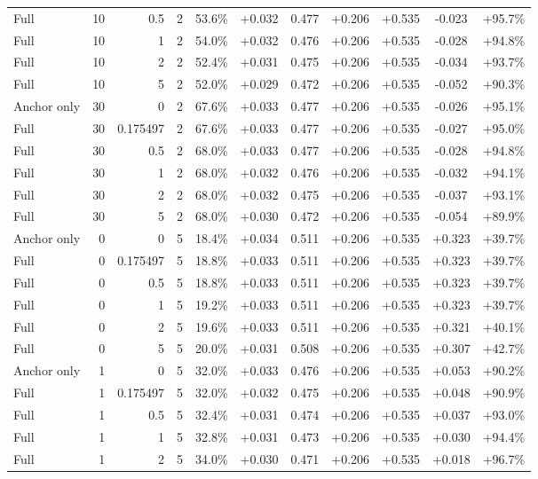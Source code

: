 \begin{table}[htbp]
\begin{tabular}{lrrrccccccc}
Full & 10 & 0.5 & 2 & 53.6\% & +0.032 & 0.477 & +0.206 & +0.535 & -0.023 & +95.7\% \\
Full & 10 & 1 & 2 & 54.0\% & +0.032 & 0.476 & +0.206 & +0.535 & -0.028 & +94.8\% \\
Full & 10 & 2 & 2 & 52.4\% & +0.031 & 0.475 & +0.206 & +0.535 & -0.034 & +93.7\% \\
Full & 10 & 5 & 2 & 52.0\% & +0.029 & 0.472 & +0.206 & +0.535 & -0.052 & +90.3\% \\
Anchor only & 30 & 0 & 2 & 67.6\% & +0.033 & 0.477 & +0.206 & +0.535 & -0.026 & +95.1\% \\
Full & 30 & 0.175497 & 2 & 67.6\% & +0.033 & 0.477 & +0.206 & +0.535 & -0.027 & +95.0\% \\
Full & 30 & 0.5 & 2 & 68.0\% & +0.033 & 0.477 & +0.206 & +0.535 & -0.028 & +94.8\% \\
Full & 30 & 1 & 2 & 68.0\% & +0.032 & 0.476 & +0.206 & +0.535 & -0.032 & +94.1\% \\
Full & 30 & 2 & 2 & 68.0\% & +0.032 & 0.475 & +0.206 & +0.535 & -0.037 & +93.1\% \\
Full & 30 & 5 & 2 & 68.0\% & +0.030 & 0.472 & +0.206 & +0.535 & -0.054 & +89.9\% \\
Anchor only & 0 & 0 & 5 & 18.4\% & +0.034 & 0.511 & +0.206 & +0.535 & +0.323 & +39.7\% \\
Full & 0 & 0.175497 & 5 & 18.8\% & +0.033 & 0.511 & +0.206 & +0.535 & +0.323 & +39.7\% \\
Full & 0 & 0.5 & 5 & 18.8\% & +0.033 & 0.511 & +0.206 & +0.535 & +0.323 & +39.7\% \\
Full & 0 & 1 & 5 & 19.2\% & +0.033 & 0.511 & +0.206 & +0.535 & +0.323 & +39.7\% \\
Full & 0 & 2 & 5 & 19.6\% & +0.033 & 0.511 & +0.206 & +0.535 & +0.321 & +40.1\% \\
Full & 0 & 5 & 5 & 20.0\% & +0.031 & 0.508 & +0.206 & +0.535 & +0.307 & +42.7\% \\
Anchor only & 1 & 0 & 5 & 32.0\% & +0.033 & 0.476 & +0.206 & +0.535 & +0.053 & +90.2\% \\
Full & 1 & 0.175497 & 5 & 32.0\% & +0.032 & 0.475 & +0.206 & +0.535 & +0.048 & +90.9\% \\
Full & 1 & 0.5 & 5 & 32.4\% & +0.031 & 0.474 & +0.206 & +0.535 & +0.037 & +93.0\% \\
Full & 1 & 1 & 5 & 32.8\% & +0.031 & 0.473 & +0.206 & +0.535 & +0.030 & +94.4\% \\
Full & 1 & 2 & 5 & 34.0\% & +0.030 & 0.471 & +0.206 & +0.535 & +0.018 & +96.7\% \\

\end{tabular}
\end{table}
